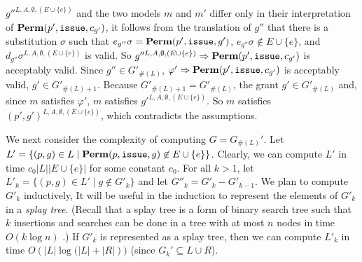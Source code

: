 \documentclass{acmtrans2m}
\newcommand{\rimp}{\Rightarrow}
\newcommand{\<}{
}
\renewcommand{\>}{\rangle}
\newcommand{\union}{\cup}
\renewcommand{\phi}{\varphi}
\newcommand{\len}[1]{|#1|}
\newcommand{\card}[1]{\#({#1})}
\newcommand{\Permitted}{\mathit{\bf Perm}}
\newcommand{\cd}{d}
\newcommand{\cc}{e}
\newcommand{\scc}{E}
\newcommand{\issue}{\mathtt{issue}}
\newcommand{\transwithE}[5]{#1^{#2, #3, #4, #5}}
\begin{document}
\begin{sloppypar}
$\transwithE{g''}{L}{A}{\emptyset}{(\scc\union\{\cc\})}$ and the two models $m$ and $m'$ differ
only in their interpretation of $\Permitted(p', \issue, c_{g'})$, it follows from the translation
of $g''$ that there is a substitution $\sigma$ such that
$\cc_{g''}\sigma = \Permitted(p', \issue, g')$, $\cc_{g''}\sigma\not\in \scc\union\{\cc\}$, and
$\transwithE{\cd_{g''}\sigma}{L}{A}{\emptyset}{(\scc\union\{\cc\})}$ is valid.  So
$\transwithE{g''}{L}{A}{\emptyset}{(\scc\union\{\cc\})}\rimp\Permitted(p',\issue, c_{g'})$ is
acceptably valid. Since $g'' \in G'_{\card{L}}$, $\phi'\rimp\Permitted(p', \issue, c_{g'})$ is
acceptably valid, $g'\in G'_{\card{L}+1}$.  Because $G'_{\card{L}+1} = G'_{\card{L}}$, the grant
$g' \in G'_{\card{L}}$ and, since $m$ satisfies $\phi'$, $m$ satisfies
$\transwithE{g'}{L}{A}{\emptyset}{(\scc\union\{\cc\})}$.  So $m$ satisfies
$\transwithE{(p', g')}{L}{A}{\emptyset}{(\scc\union\{\cc\})}$, which contradicts the assumptions.

We next consider the complexity of computing $G = G_{\card{L}}'$.  Let
$L' = \{(p,g) \in L \mid \Permitted(p, \issue, g)\not\in E\union\{\cc\} \}$.  Clearly, we can
compute $L'$ in time $c_0\len{L}\len{\scc\union \{\cc\}}$ for some constant $c_0$.  For all
$k > 1$, let $L'_k = \{(p,g) \in L' \mid g \notin G'_k\}$ and let $G''_{k} = G'_{k} - G'_{k-1}$.
We plan to compute $G'_k$ inductively,  It will be useful in the induction to represent the
elements of $G'_k$ in a \emph{splay tree}.  (Recall that a splay tree is a form of binary search
tree such that $k$ insertions and searches can be done in a tree with at most $n$ nodes in time
$O(k \log n)$ \cite{ST}.)  If $G'_k$ is represented as a splay tree, then we can compute $L'_k$
in time $O(\len{L} \log{(\len{L} + \len{R}}))$ (since $G_k' \subseteq L \union R$).


\end{sloppypar}
\end{document}
